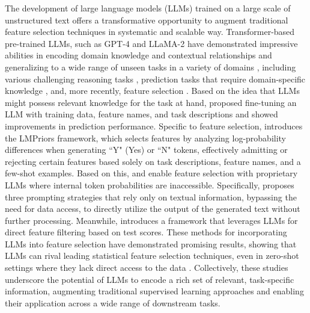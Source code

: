 The development of large language models (LLMs) trained on a large scale of unstructured text offers a transformative opportunity to augment traditional feature selection techniques in systematic and scalable way.  Transformer-based pre-trained LLMs, such as GPT-4 \citep{openai2023gpt4} and LLaMA-2 \citep{touvron2023llama}  have demonstrated impressive abilities in encoding domain knowledge and contextual relationships and generalizing to a wide range of unseen tasks in a variety of domains \citep{vaswani2017attention,brown2020gpt3,radford2019language,manikandan2023language}, including various challenging reasoning tasks \citep{wei2022chain,lewkowycz2022solving,suzgun2023challenging}, prediction tasks that require domain-specific knowledge \citep{petroni2019language,dinh2022lift,chen2024embeddings,theodoris2023transfer,cui2024scgpt}, and, more recently, feature selection \citep{choi2022lmpriorspretrainedlanguagemodels,jeong2024llmselectfeatureselectionlarge,li2024exploringlargelanguagemodels, liu2024ice_search, han2024largelanguagemodelsautomatically}. 
Based on the idea that LLMs might possess relevant knowledge for the task at hand, \cite{dinh2022lift} proposed fine-tuning an LLM with training data, feature names, and task descriptions and showed improvements in prediction performance.
Specific to feature selection, \cite{choi2022lmpriorspretrainedlanguagemodels} introduces the LMPriors framework, which selects features by analyzing log-probability differences when generating ``Y" (Yes) or ``N" tokens, effectively admitting or rejecting certain features based solely on task descriptions, feature names, and a few-shot examples. Based on this, \cite{jeong2024llmselectfeatureselectionlarge} and \cite{liu2024ice_search} enable feature selection with proprietary LLMs where internal token probabilities are inaccessible. Specifically, \cite{jeong2024llmselectfeatureselectionlarge} proposes three prompting strategies that rely only on textual information, bypassing the need for data access, to directly utilize the output of the generated text without further processing. Meanwhile, \cite{liu2024ice_search} introduces a framework that leverages LLMs for direct feature filtering based on test scores. These methods for incorporating LLMs into feature selection have demonstrated promising results, showing that LLMs can rival leading statistical feature selection techniques, even in zero-shot settings where they lack direct access to the data \citep{choi2022lmpriorspretrainedlanguagemodels, jeong2024llmselectfeatureselectionlarge}. Collectively, these studies underscore the potential of LLMs to encode a rich set of relevant, task-specific information, augmenting traditional supervised learning approaches and enabling their application across a wide range of downstream tasks. %

